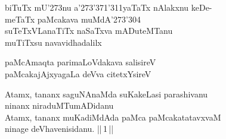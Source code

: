 \begin{entry}
\gl{}
\begin{shl}
biTuTx mU\char'273nu a\char'273\char'371\char'311yaTaTx nAlakxnu
keDe-\\
meTaTx paMcakava muMdA\char'273\char'304\\
suTeTxVLanaTiTx naSaTxva mADuteMTanu\\
muTiTxsu navavidhadalilx
\end{shl}
\end{entry}

\begin{entry}
\begin{shl}
paMcAmaqta parimaLoVdakava salisireV\\
paMcakajAjxyagaLa deVva citetxYsireV
\end{shl}
\end{entry}

\begin{entry}
\begin{shl}
Atamx, tananx saguNAnaMda suKakeLasi parashivanu \\
ninanx niraduMTumADidanu\\
Atamx, tananx muKadiMdAda paMca paMcakatatavxvaM\\
ninage deVhavenisidanu. ||\,1\,||
\end{shl}
\end{entry}

\begin{entry}
\end{entry}

